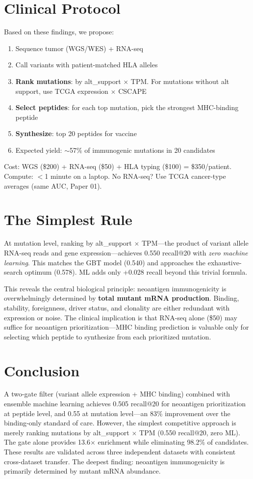 \documentclass[11pt,twocolumn]{article}
\begin{document}
\section{Clinical Protocol}

Based on these findings, we propose:
\begin{enumerate}[nosep]
\item Sequence tumor (WGS/WES) + RNA-seq
\item Call variants with patient-matched HLA alleles
\item \textbf{Rank mutations}: by alt\_support $\times$ TPM.
For mutations without alt support, use TCGA expression $\times$ CSCAPE
\item \textbf{Select peptides}: for each top mutation, pick the
strongest MHC-binding peptide
\item \textbf{Synthesize}: top 20 peptides for vaccine
\item Expected yield: $\sim$57\% of immunogenic mutations in 20 candidates
\end{enumerate}

Cost: WGS (\$200) + RNA-seq (\$50) + HLA typing (\$100) = \$350/patient.
Compute: $<$1 minute on a laptop. No RNA-seq? Use TCGA cancer-type
averages (same AUC, Paper 01).

\section{The Simplest Rule}

At mutation level, ranking by alt\_support $\times$ TPM---the product
of variant allele RNA-seq reads and gene expression---achieves 0.550
recall@20 with \textit{zero machine learning}. This matches the GBT
model (0.540) and approaches the exhaustive-search optimum (0.578).
ML adds only +0.028 recall beyond this trivial formula.

This reveals the central biological principle: neoantigen immunogenicity
is overwhelmingly determined by \textbf{total mutant mRNA production}.
Binding, stability, foreignness, driver status, and clonality are either
redundant with expression or noise. The clinical implication is that
RNA-seq alone (\$50) may suffice for neoantigen prioritization---MHC
binding prediction is valuable only for selecting which peptide to
synthesize from each prioritized mutation.

\section{Conclusion}

A two-gate filter (variant allele expression + MHC binding) combined
with ensemble machine learning achieves 0.505 recall@20 for neoantigen
prioritization at peptide level, and 0.55 at mutation level---an 83\%
improvement over the binding-only standard of care. However, the
simplest competitive approach is merely ranking mutations by
alt\_support $\times$ TPM (0.550 recall@20, zero ML). The gate alone
provides 13.6$\times$ enrichment while eliminating 98.2\% of candidates.
These results are validated across three independent datasets with
consistent cross-dataset transfer. The deepest finding: neoantigen
immunogenicity is primarily determined by mutant mRNA abundance.
\end{document}
